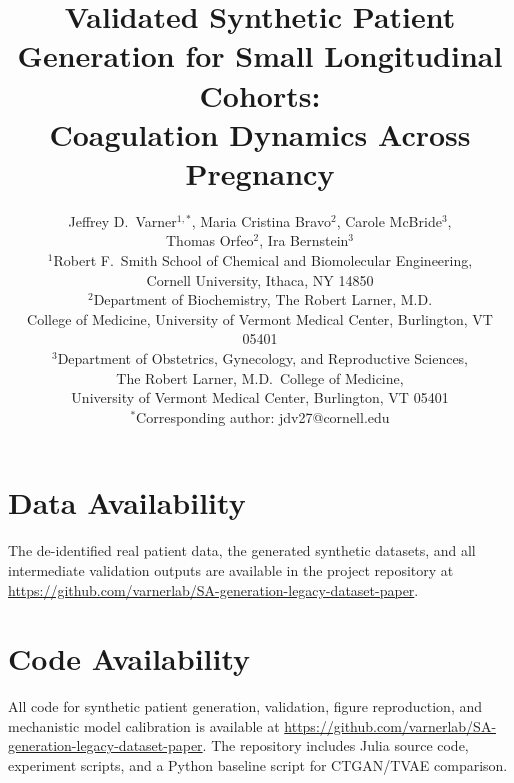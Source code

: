 \documentclass[11pt]{article}
\title{Validated Synthetic Patient Generation for Small Longitudinal Cohorts: \\
Coagulation Dynamics Across Pregnancy}
\author{
Jeffrey D.\ Varner$^{1,*}$,
Maria Cristina Bravo$^{2}$,
Carole McBride$^{3}$,
\\
Thomas Orfeo$^{2}$,
Ira Bernstein$^{3}$
\\[6pt]
{\small $^{1}$Robert F.\ Smith School of Chemical and Biomolecular Engineering,} \\
{\small Cornell University, Ithaca, NY 14850} \\
{\small $^{2}$Department of Biochemistry, The Robert Larner, M.D.} \\
{\small College of Medicine, University of Vermont Medical Center, Burlington, VT 05401} \\
{\small $^{3}$Department of Obstetrics, Gynecology, and Reproductive Sciences,} \\
{\small The Robert Larner, M.D.\ College of Medicine,} \\
{\small University of Vermont Medical Center, Burlington, VT 05401} \\[6pt]
{\small $^{*}$Corresponding author: jdv27@cornell.edu}
}
\date{}
\begin{document}
\maketitle

\begin{abstract}

\end{abstract}






\section*{Data Availability}
The de-identified real patient data, the generated synthetic datasets, and all
intermediate validation outputs are available in the project repository at
\url{https://github.com/varnerlab/SA-generation-legacy-dataset-paper}.

\section*{Code Availability}
All code for synthetic patient generation, validation, figure reproduction,
and mechanistic model calibration is available at
\url{https://github.com/varnerlab/SA-generation-legacy-dataset-paper}.
The repository includes Julia source code, experiment scripts, and a Python
baseline script for CTGAN/TVAE comparison.






\clearpage


\clearpage

\end{document}
